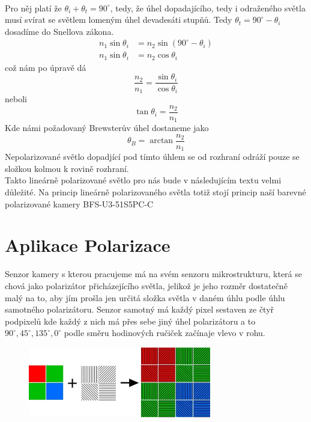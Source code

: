 \documentclass[a4paper]{article}
\numberwithin{equation}{section}
\begin{document}
    \\Pro něj platí že $\theta_i + \theta_t = 90^{\circ}$, tedy, že úhel
    dopadajícího, tedy i odraženého světla musí svírat se světlem lomeným úhel devadesáti stupňů. Tedy 
    $\theta_t = 90^{\circ} - \theta_i$ dosadíme do Snellova zákona. 
    \begin{equation}
        \!
        \begin{aligned}
            n_1 \sin \theta_i &= n_2 \sin (90^{\circ} - \theta_i) \\
            n_1 \sin \theta_i &= n_2 \cos \theta_i
        \end{aligned}
    \end{equation} 
    což nám po úpravě dá 
    \begin{equation}
        \frac{n_2}{n_1} = \frac{\sin \theta_i}{\cos \theta_i}
    \end{equation}
    neboli
    \begin{equation}
        \tan \theta_i = \frac{n_2}{n_1}
    \end{equation}
    Kde námi požadovaný Brewsterův úhel dostaneme jako
    \begin{equation}
        \theta_B = \arctan \frac{n_2}{n_1}
    \end{equation}
    Nepolarizované světlo dopadjící pod tímto úhlem se od rozhraní odráží pouze se složkou kolmou k rovině
    rozhraní. \cite{hecht} 
    \\Takto lineárně polarizované světlo pro nás bude v následujícím textu velmi důležité. Na princip lineárně
    polarizovaného světla totiž stojí princip naší barevné polarizované kamery BFS-U3-51S5PC-C

    \newpage
	\section{Aplikace Polarizace}
	Senzor kamery s kterou pracujeme má na svém senzoru mikrostrukturu, která se chová jako polarizátor
    přicházejícího světla, jelikož je jeho rozměr dostatečně malý na to, aby jím prošla jen určitá složka světla
    v daném úhlu podle úhlu samotného polarizátoru. Senzor samotný má každý pixel sestaven ze čtyř podpixelů
    kde každý z nich má přes sebe jiný úhel polarizátoru a to $90^{\circ}, 45^{\circ}, 135^{\circ}, 0^{\circ}$
    podle směru hodinových ručiček začínaje vlevo v rohu.
    \begin{figure}[h]
        \includegraphics[width=8cm]{figures/senzor.jpg}
        \centering
    \end{figure}
\end{document}
